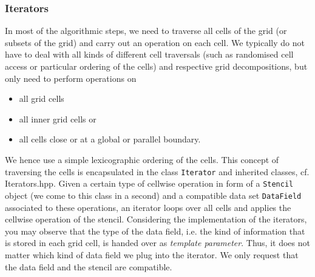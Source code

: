 \documentclass[pdftex,A4]{article}
\begin{document}
\subsubsection{Iterators}\label{sec:iterators}
In most of the algorithmic steps, we need to traverse all cells of the grid (or subsets of the grid) and carry out an operation on each cell.
We typically do not have to deal with all kinds of different cell traversals (such as randomised cell access or particular ordering of the cells) and respective grid decompositions, but only need to perform operations on
  \begin{itemize}
  \item all grid cells
  \item all inner grid cells or
  \item all cells close or at a global or parallel boundary.
  \end{itemize}
We hence use a simple lexicographic ordering of the cells.
This concept of traversing the cells is encapsulated in the class {\tt Iterator} and inherited classes, cf. Iterators.hpp.
Given a certain type of cellwise operation in form of a {\tt Stencil} object (we come to this class in a second) and a compatible data set {\tt DataField} associated to these operations, an iterator loops over all cells and applies the cellwise operation of the stencil.
Considering the implementation of the iterators, you may observe that the type of the data field, i.e. the kind of information that is stored in each grid cell, is handed over as {\it template parameter}.
Thus, it does not matter which kind of data field we plug into the iterator. We only request that the data field and the stencil are compatible.
\end{document}
